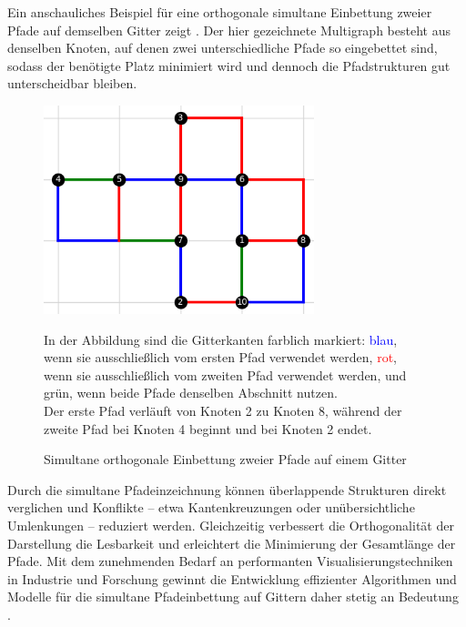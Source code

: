 \documentclass[bachelor, german]{algothesis}
\begin{document}
Ein anschauliches Beispiel für eine orthogonale simultane Einbettung zweier Pfade auf demselben Gitter zeigt . Der hier gezeichnete Multigraph besteht aus denselben Knoten, auf denen zwei unterschiedliche Pfade so eingebettet sind, sodass der benötigte Platz minimiert wird und dennoch die Pfadstrukturen gut unterscheidbar bleiben.
\begin{figure}[H]
    \begin{minipage}{0.5\textwidth}
    \centering
    \includegraphics[width=0.7\textwidth]{figures/Simultaneous.png}
    \caption{Simultane orthogonale Einbettung zweier Pfade auf einem Gitter}
    \label{fig:simultaneous}
    \end{minipage}
    \begin{minipage}{0.5\textwidth}
    \small
        In der Abbildung sind die Gitterkanten farblich markiert: \textcolor{blue}{blau}, wenn sie ausschließlich vom ersten Pfad verwendet werden, \textcolor{red}{rot}, wenn sie ausschließlich vom zweiten Pfad verwendet werden, und \textcolor{OliveGreen}{grün}, wenn beide Pfade denselben Abschnitt nutzen. \\
        Der erste Pfad verläuft von Knoten 2 zu Knoten 8, während der zweite Pfad bei Knoten 4 beginnt und bei Knoten 2 endet.
    \end{minipage}
\end{figure}

Durch die simultane Pfadeinzeichnung können überlappende Strukturen direkt verglichen und Konflikte – etwa Kantenkreuzungen oder unübersichtliche Umlenkungen – reduziert werden. Gleichzeitig verbessert die Orthogonalität der Darstellung die Lesbarkeit und erleichtert die Minimierung der Gesamtlänge der Pfade. Mit dem zunehmenden Bedarf an performanten Visualisierungstechniken in Industrie und Forschung gewinnt die Entwicklung effizienter Algorithmen und Modelle für die simultane Pfadeinbettung auf Gittern daher stetig an Bedeutung \cite{Handbook}.
\end{document}
